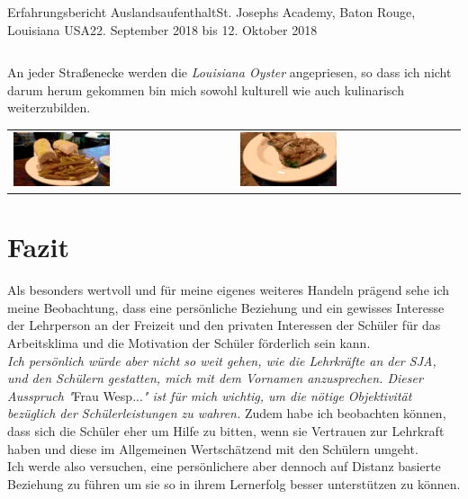 \documentclass[oneside,openany,headings=optiontotoc,11pt,numbers=noenddot]{article}
\begin{document}
\begin{worksheet}{Erfahrungsbericht Auslandsaufenthalt}{St. Joseph\grq{}s Academy, Baton Rouge, Louisiana USA}{22. September 2018 bis 12. Oktober 2018}
\begin{center}
\begin{tabularx}{\textwidth}{XX}
			\end{tabularx}
		\end{center}
		An jeder Straßenecke werden die \textit{Louisiana Oyster} angepriesen, so dass ich nicht darum herum gekommen bin mich sowohl kulturell wie auch kulinarisch weiterzubilden.\\
		\begin{center}
			\begin{tabularx}{\textwidth}{XX}
				\includegraphics[width=0.45\textwidth]{../99_Bilder/00_food.jpg} & \includegraphics[width=0.45\textwidth]{../99_Bilder/01_food.jpg}
			\end{tabularx}
		\end{center}
		\section{Fazit}
		Als besonders wertvoll und für meine eigenes weiteres Handeln prägend sehe ich meine Beobachtung, dass eine persönliche Beziehung und ein gewisses Interesse der Lehrperson an der Freizeit und den privaten Interessen der Schüler für das Arbeitsklima und die Motivation der Schüler förderlich sein kann.\\
		\textit{Ich persönlich würde aber nicht so weit gehen, wie die Lehrkräfte an der SJA, und den Schülern gestatten, mich mit dem Vornamen anzusprechen. Dieser Ausspruch "}Frau Wesp...\textit{" ist für mich wichtig, um die nötige Objektivität bezüglich der Schülerleistungen zu wahren.}
		Zudem habe ich beobachten können, dass sich die Schüler eher um Hilfe zu bitten, wenn sie Vertrauen zur Lehrkraft haben und diese im Allgemeinen Wertschätzend mit den Schülern umgeht.\\
		Ich werde also versuchen, eine persönlichere aber dennoch auf Distanz basierte Beziehung zu führen um sie so in ihrem Lernerfolg besser unterstützen zu können.\\
		\par\noindent
	\end{worksheet}
\end{document}
